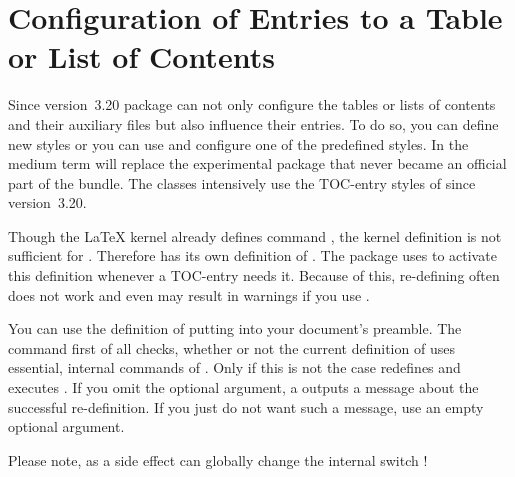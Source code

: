 \section{Configuration of Entries to a Table or List of Contents}
%
\BeginIndexGroup
{}%

Since version~3.20 package
 can not only configure the tables or lists of contents and
their auxiliary files but also influence their entries. To do so, you can
define new styles or you can use and configure one of the predefined
styles. In the medium term  will replace the experimental
package  that never became an official part of the
\KOMAScript{} bundle. The \KOMAScript{} classes intensively use the TOC-entry
styles of  since version~3.20.

\begin{Declaration}
\end{Declaration}
Though the \LaTeX{} kernel
already defines command , the kernel definition is not
sufficient for . Therefore  has its own
definition of . The package uses
 to activate this definition whenever a TOC-entry
needs it. Because of this, re-defining  often does not work
and even may result in warnings if you use .

You can use the definition of  putting
 into your document's preamble. The command first
of all checks, whether or not the current definition of 
uses essential, internal commands of . Only if this is not
the case  redefines  and
executes . If you omit the optional argument, a
 outputs a message about the successful re-definition. If
you just do not want such a message, use an empty optional argument.

Please note, as a side effect
 can globally change the internal switch
!%
\EndIndexGroup


